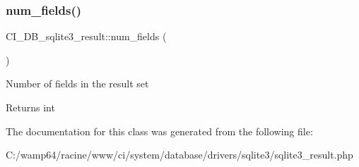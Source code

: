 \subsubsection{\texorpdfstring{num\+\_\+fields()}{num\_fields()}}
{\footnotesize\ttfamily C\+I\+\_\+\+D\+B\+\_\+sqlite3\+\_\+result\+::num\+\_\+fields (\begin{DoxyParamCaption}{ }\end{DoxyParamCaption})}

Number of fields in the result set

\begin{DoxyReturn}{Returns}
int 
\end{DoxyReturn}


The documentation for this class was generated from the following file\+:\begin{DoxyCompactItemize}
\item 
C\+:/wamp64/racine/www/ci/system/database/drivers/sqlite3/sqlite3\+\_\+result.\+php\end{DoxyCompactItemize}
